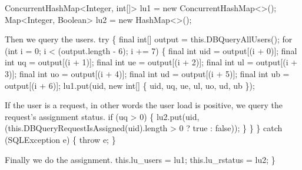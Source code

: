 \documentclass{article}
\def\nwendcode{\endtrivlist \endgroup}      %
\let\nwdocspar=\par
\theoremstyle{definition}                   %
\begin{document}
  ConcurrentHashMap<Integer, int[]> lu1 = new ConcurrentHashMap<>();
  Map<Integer, Boolean>             lu2 = new HashMap<>();
\nwendcode{}\nwdocspar
{\small Then we query the users.}
\nwenddocs{}\plusendmoddef
  try \{
    final int[] output = this.DBQueryAllUsers();
    for (int i = 0; i < (output.length - 6); i += 7) \{
      final int uid = output[(i + 0)];
      final int  uq = output[(i + 1)];
      final int  ue = output[(i + 2)];
      final int  ul = output[(i + 3)];
      final int  uo = output[(i + 4)];
      final int  ud = output[(i + 5)];
      final int  ub = output[(i + 6)];
      lu1.put(uid, new int[] \{ uid, uq, ue, ul, uo, ud, ub \});
\nwendcode{}\nwdocspar
{\small If the user is a request, in other words the user load is positive,
we query the request's assignment status.}
\nwenddocs{}\plusendmoddef
      if (uq > 0) \{
        lu2.put(uid, (this.DBQueryRequestIsAssigned(uid).length > 0 ? true : false));
      \}
    \}
  \} catch (SQLException e) \{
    throw e;
  \}
\nwendcode{}\nwdocspar
{\small Finally we do the assignment.}
\nwenddocs{}\plusendmoddef
  this.lu_users   = lu1;
  this.lu_rstatus = lu2;
\}
\nwendcode{}\nwdocspar
\end{document}
